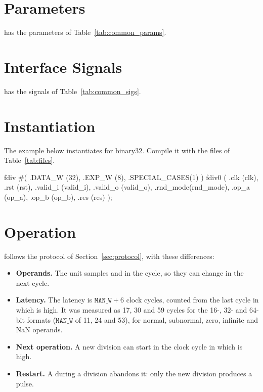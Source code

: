 \section{Parameters}

 has the parameters of Table~\ref{tab:common_params}.

\section{Interface Signals}

 has the signals of Table~\ref{tab:common_sigs}.

\section{Instantiation}

The example below instantiates  for binary32. Compile it with the files
of Table~\ref{tab:files}.

\begin{vcode}
fdiv #(
   .DATA_W       (32),
   .EXP_W        (8),
   .SPECIAL_CASES(1)
) fdiv0 (
   .clk     (clk),
   .rst     (rst),
   .valid_i (valid_i),
   .valid_o (valid_o),
   .rnd_mode(rnd_mode),
   .op_a    (op_a),
   .op_b    (op_b),
   .res     (res)
);
\end{vcode}

\section{Operation}

 follows the protocol of Section~\ref{sec:protocol}, with these
differences:

\begin{itemize}
\item \textbf{Operands.} The unit samples  and  in the
   cycle, so they can change in the next cycle.
\item \textbf{Latency.} The latency is $\mathtt{MAN\_W}+6$ clock cycles,
  counted from the last cycle in which  is high. It was measured as
  17, 30 and 59 cycles for the 16-, 32- and 64-bit formats ($\mathtt{MAN\_W}$ of
  11, 24 and 53), for normal, subnormal, zero, infinite and NaN operands.
\item \textbf{Next operation.} A new division can start in the clock cycle in
  which  is high.
\item \textbf{Restart.} A  during a division abandons it: only the new
  division produces a  pulse.
\end{itemize}

